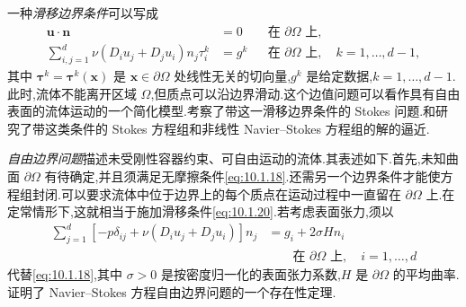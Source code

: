 一种\emph{滑移边界条件}可以写成
\begin{align}
  \boldsymbol{u}\cdot\boldsymbol{n}&=0
      &&\text{在 }\partial\Omega\text{ 上},\label{eq:10.1.20}\\
  \sum_{i,j=1}^d\nu(D_iu_j+D_ju_i)n_j\tau_i^k&=g^k
      &&\text{在 }\partial\Omega\text{ 上},\quad k=1,\ldots,d-1,\label{eq:10.1.21}
\end{align}
其中 \(\boldsymbol{\tau}^k=\boldsymbol{\tau}^k(\boldsymbol{x})\) 是 \(\boldsymbol{x}\in\partial\Omega\) 处线性无关的切向量,\(g^k\) 是给定数据,\(k=1,\ldots,d-1\).此时,流体不能离开区域 \(\Omega\),但质点可以沿边界滑动.这个边值问题可以看作具有自由表面的流体运动的一个简化模型.考察了带这一滑移边界条件的 Stokes 问题.和研究了带这类条件的 Stokes 方程组和非线性 Navier--Stokes 方程组的解的逼近.

\emph{自由边界问题}描述未受刚性容器约束、可自由运动的流体.其表述如下.首先,未知曲面 \(\partial\Omega\) 有待确定,并且须满足无摩擦条件\eqref{eq:10.1.18}.还需另一个边界条件才能使方程组封闭.可以要求流体中位于边界上的每个质点在运动过程中一直留在 \(\partial\Omega\) 上.在定常情形下,这就相当于施加滑移条件\eqref{eq:10.1.20}.若考虑表面张力,须以
\begin{equation}\label{eq:10.1.22}
  \begin{aligned}
    \sum_{j=1}^d[-p\delta_{ij}+\nu(D_iu_j+D_ju_i)]n_j
      &=g_i+2\sigma Hn_i\\
      &\qquad\text{在 }\partial\Omega\text{ 上},\quad i=1,\ldots,d
  \end{aligned}
\end{equation}
代替\eqref{eq:10.1.18},其中 \(\sigma>0\) 是按密度归一化的表面张力系数,\(H\) 是 \(\partial\Omega\) 的平均曲率.证明了 Navier--Stokes 方程自由边界问题的一个存在性定理.

